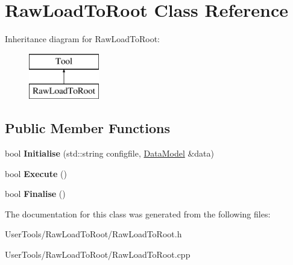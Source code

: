 \hypertarget{classRawLoadToRoot}{\section{Raw\-Load\-To\-Root Class Reference}
\label{classRawLoadToRoot}
}
Inheritance diagram for Raw\-Load\-To\-Root\-:\begin{figure}[H]
\begin{center}
\leavevmode
\includegraphics[height=2.000000cm]{classRawLoadToRoot}
\end{center}
\end{figure}
\subsection*{Public Member Functions}
\begin{DoxyCompactItemize}
\item 
\hypertarget{classRawLoadToRoot_a418fe1aee31a54f78f58a149b42681a7}{bool {\bfseries Initialise} (std\-::string configfile, \hyperlink{classDataModel}{Data\-Model} \&data)}\label{classRawLoadToRoot_a418fe1aee31a54f78f58a149b42681a7}

\item 
\hypertarget{classRawLoadToRoot_ad7b372c9dbe8575d276ffc7c3e8cb343}{bool {\bfseries Execute} ()}\label{classRawLoadToRoot_ad7b372c9dbe8575d276ffc7c3e8cb343}

\item 
\hypertarget{classRawLoadToRoot_ae5bde44a885e69d0dabe6fc8b39f607e}{bool {\bfseries Finalise} ()}\label{classRawLoadToRoot_ae5bde44a885e69d0dabe6fc8b39f607e}

\end{DoxyCompactItemize}


The documentation for this class was generated from the following files\-:\begin{DoxyCompactItemize}
\item 
User\-Tools/\-Raw\-Load\-To\-Root/Raw\-Load\-To\-Root.\-h\item 
User\-Tools/\-Raw\-Load\-To\-Root/Raw\-Load\-To\-Root.\-cpp\end{DoxyCompactItemize}
